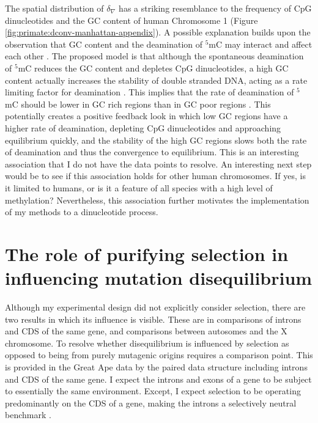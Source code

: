The spatial distribution of $\delta_\nabla$ has a striking resemblance to the frequency of CpG dinucleotides and the GC content of human Chromosome 1 (Figure \ref{fig:primate:dconv-manhattan-appendix}). A possible explanation builds upon the observation that GC content and the deamination of $^5$mC may interact and affect each other \citep{Fryxell2000CytosineIsochores, Mugal2015EvolutionaryGenomes}. The proposed model is that although the spontaneous deamination of $^5$mC reduces the GC content and depletes CpG dinucleotides,  a high GC content actually increases the stability of double stranded DNA, acting as a rate limiting factor for deamination \citep{Mugal2015EvolutionaryGenomes}. This implies that the rate of deamination of $^5$mC should be lower in GC rich regions than in GC poor regions \citep{Mugal2015EvolutionaryGenomes}. This potentially creates a positive feedback look in which low GC regions have a higher rate of deamination, depleting CpG dinucleotides and approaching equilibrium quickly, and the stability of the high GC regions slows both the rate of deamination and thus the convergence to equilibrium. This is an interesting association that I do not have the data points to resolve. An interesting next step would be to see if this association holds for other human chromosomes. If yes, is it limited to humans, or is it a feature of all species with a high level of methylation? Nevertheless, this association further motivates the implementation of my methods to a dinucleotide process. 

\section{The role of purifying selection in influencing mutation disequilibrium}

Although my experimental design did not explicitly consider selection, there are two results in which its influence is visible. These are in comparisons of introns and CDS of the same gene, and comparisons between autosomes and the X chromosome. To resolve whether disequilibrium is influenced by selection as opposed to being from purely mutagenic origins requires a comparison point. This is provided in the Great Ape data by the paired data structure including introns and CDS of the same gene. I expect the introns and exons of a gene to be subject to essentially the same environment. Except, I expect selection to be operating predominantly on the CDS of a gene, making the introns a selectively neutral benchmark \citep{Graur2013OnENCODE}. 

